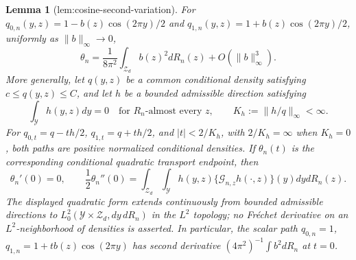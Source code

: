 \documentclass{article}
\newtheorem{lemma}{Lemma}
\begin{document}
\begin{lemma}[lem:cosine-second-variation]\label{lem:cosine-second-variation}
For \(q_{0,n}(y,z)=1-b(z)\cos(2\pi y)/2\) and \(q_{1,n}(y,z)=1+b(z)\cos(2\pi y)/2\), uniformly as \(\|b\|_{\infty}\to0\),
\[
\theta_n=\frac{1}{8\pi^2}\int_{\mathcal Z_d}b(z)^2dR_n(z)+O(\|b\|_{\infty}^3).
\]
More generally, let \(q(y,z)\) be a common conditional density satisfying \(c\le q(y,z)\le C\), and let \(h\) be a bounded admissible direction satisfying
\[
\int_{\mathcal Y}h(y,z)dy=0\quad\text{for }R_n\text{-almost every }z,
\qquad K_h:=\|h/q\|_{\infty}<\infty.
\]
For \(q_{0,t}=q-th/2\), \(q_{1,t}=q+th/2\), and \(|t|<2/K_h\), with \(2/K_h=\infty\) when \(K_h=0\), both paths are positive normalized conditional densities. If \(\theta_n(t)\) is the corresponding conditional quadratic transport endpoint, then
\[
\theta_n'(0)=0,
\qquad
\frac12\theta_n''(0)
=\int_{\mathcal Z_d}\int_{\mathcal Y}
h(y,z)\{\mathcal G_{n,z}h(\cdot,z)\}(y)dydR_n(z).
\]
The displayed quadratic form extends continuously from bounded admissible directions to \(L_0^2(\mathcal Y\times\mathcal Z_d,dy\,dR_n)\) in the \(L^2\) topology; no Fr\'echet derivative on an \(L^2\)-neighborhood of densities is asserted. In particular, the scalar path \(q_{0,n}=1\), \(q_{1,n}=1+t b(z)\cos(2\pi y)\) has second derivative \((4\pi^2)^{-1}\int b^2dR_n\) at \(t=0\).
\end{lemma}
\end{document}
